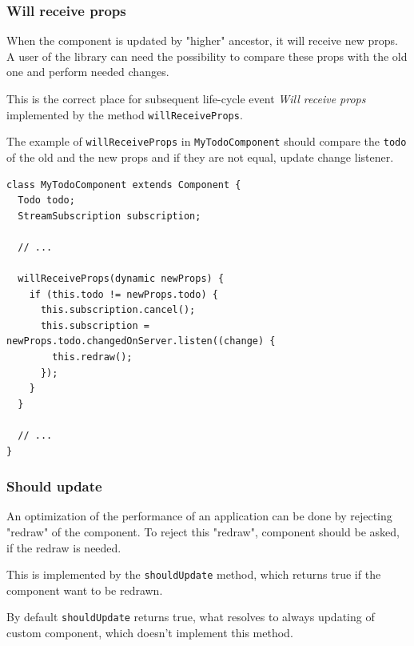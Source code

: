 \documentclass[oneside, 12pt]{book}
\begin{document}
    \subsubsection{Will receive props}\label{subsec:our-architecture-lifecycle-willreceiveprops}

      When the component is updated by "higher" ancestor, it will receive new props.
      A user of the library can need the possibility to compare these props with the old one
      and perform needed changes. 

      This is the correct place for subsequent life-cycle event \textit{Will receive props}
      implemented by the method \texttt{willReceiveProps}. 

      The example of \texttt{willReceiveProps} in \texttt{MyTodoComponent} 
      should compare the \texttt{todo} of the old and the new props and if they are not equal, 
      update change listener.
      \begin{verbatim}
class MyTodoComponent extends Component {
  Todo todo;
  StreamSubscription subscription;

  // ...

  willReceiveProps(dynamic newProps) {
    if (this.todo != newProps.todo) {
      this.subscription.cancel();
      this.subscription = newProps.todo.changedOnServer.listen((change) {
        this.redraw();
      });
    }
  }

  // ...
}
      \end{verbatim}



      
    \subsubsection{Should update}\label{subsec:our-architecture-lifecycle-shouldupdate}

      An optimization of the performance of an application can be done by rejecting "redraw" of the component.
      To reject this "redraw", component should be asked, if the redraw is needed. 

      This is implemented by the \texttt{shouldUpdate} method, which returns true if the component want to be redrawn. 

      By default \texttt{shouldUpdate} returns true, 
      what resolves to always updating of custom component, which doesn't implement this method.
\end{document}
